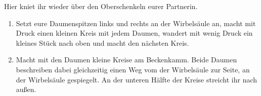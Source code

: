 Hier kniet ihr wieder über den Oberschenkeln eurer Partnerin.

\begin{enumerate}
  \item {} Setzt eure Daumenspitzen links und rechts an der Wirbelsäule an, macht mit Druck einen kleinen Kreis mit jedem Daumen, wandert mit wenig Druck ein kleines Stück nach oben und macht den nächsten Kreis.
  \iftoggle{long}{
    \item \fett{Daumenstreichungen am Illiosakralgelenk:} Streicht etwas oberhalb des Illiosakralgelenks (also oberhalb der Stelle, wo die Wirbelsäule den Beckenknochen berührt) fächerförmig mit den Daumenspitzen schräg nach außen/oben.
  }{}
  \item {} Macht mit den Daumen kleine Kreise am Beckenkamm. Beide Daumen beschreiben dabei gleichzeitig einen Weg vom der Wirbelsäule zur Seite, an der Wirbelsäule gespiegelt. An der unteren Hälfte der Kreise streicht ihr nach außen.
  \iftoggle{long}{
    \item \fett{Bahnen mit aufgestellten Fingern:} Formt mit offenen Fingern Tigerkrallen und streicht mit den Fingerspitzen der aufgestellten, angespannten Finger kräftig von der Hüfte in Richtung Kopf.
  }{}
\end{enumerate}
\pagebreak


